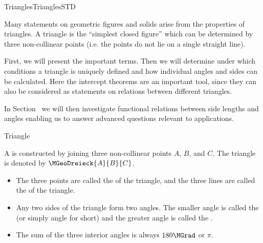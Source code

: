 \begin{MXContent}{Triangles}{Triangles}{STD}

Many statements on geometric figures and solids arise from the properties of 
triangles. A triangle is the ``simplest closed figure'' which can be determined by 
three non-collinear points (i.e. the points do not lie on a single straight line).



First, we will present the important terms. Then we will determine
under which conditions a triangle is uniquely defined and how individual 
angles and sides can be calculated. Here the intercept theorems are an important tool, 
since they can also be considered as statements on relations between different triangles.

In Section~ we will then investigate functional relations 
between side lengths and angles enabling us to answer advanced questions 
relevant to applications.

\begin{MXInfo}{Triangle}%

A  is constructed by joining three non-collinear points $A$, $B$, and $C$. 
The triangle is denoted by $\MGeoDreieck{A}{B}{C}$.

\begin{itemize}
 \item The three points are called the  of the triangle, and the 
three lines are called the  of the triangle.
    
 \item Any two sides of the triangle form two angles. The smaller angle is called the
 (or simply angle for short) and the greater 
angle is called the .
 
 \item The sum of the three interior angles is always $180\MGrad$ or $\pi$.
\end{itemize}
\end{MXInfo}


\end{MXContent}
